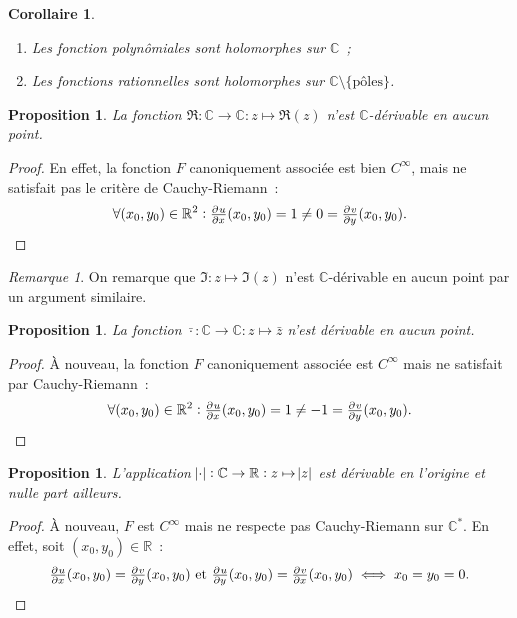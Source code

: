 \documentclass{report}
\newtheorem{prp}[thm]{Proposition}
\newtheorem{cor}[thm]{Corollaire}
\theoremstyle{definition}
\theoremstyle{remark}
\newtheorem*{rmq}{Remarque}
\numberwithin{equation}{section}
\newcommand{\C}{\mathbb C}
\newcommand{\R}{\mathbb R}
\newcommand{\poles}{{\{\text{pôles}\}}}
\begin{document}
			\begin{cor}~
				\begin{enumerate}
					\item Les fonction polynômiales sont holomorphes sur $\C$~;
					\item Les fonctions rationnelles sont holomorphes sur $\C \setminus \poles$.
				\end{enumerate}
			\end{cor}

			\begin{prp} La fonction $\Re : \C \to \C : z \mapsto \Re(z)$ n'est $\C$-dérivable en aucun point.
			\end{prp}

			\begin{proof} En effet, la fonction $F$ canoniquement associée est bien $C^\infty$, mais ne satisfait pas le critère de Cauchy-Riemann~:
			\begin{equation}
				\forall (x_0, y_0) \in \R^2 : \pd ux(x_0, y_0) = 1 \neq 0 = \pd vy(x_0, y_0).
			\end{equation}
			\end{proof}

			\begin{rmq} On remarque que $\Im : z \mapsto \Im(z)$ n'est $\C$-dérivable en aucun point par un argument similaire.
			\end{rmq}

			\begin{prp} La fonction $\bar \cdot : \C \to \C : z \mapsto \bar z$ n'est dérivable en aucun point.
			\end{prp}

			\begin{proof} À nouveau, la fonction $F$ canoniquement associée est $C^\infty$ mais ne satisfait par Cauchy-Riemann~:
			\begin{equation}
				\forall (x_0, y_0) \in \R^2 : \pd ux(x_0, y_0) = 1 \neq -1 = \pd vy(x_0, y_0).
			\end{equation}
			\end{proof}

			\begin{prp} L'application $\abs \cdot : \C \to \R : z \mapsto \abs z$ est dérivable en l'origine et nulle part ailleurs.
			\end{prp}

			\begin{proof} À nouveau, $F$ est $C^\infty$ mais ne respecte pas Cauchy-Riemann sur $\C^*$. En effet, soit $(x_0, y_0) \in \R$~:
			\begin{equation}
				\pd ux(x_0, y_0) = \pd vy(x_0, y_0) \text{ et } \pd uy(x_0, y_0) = \pd vx(x_0, y_0) \iff x_0 = y_0 = 0.
			\end{equation}
			\end{proof}
\end{document}
